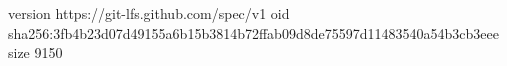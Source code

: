 version https://git-lfs.github.com/spec/v1
oid sha256:3fb4b23d07d49155a6b15b3814b72ffab09d8de75597d11483540a54b3cb3eee
size 9150
